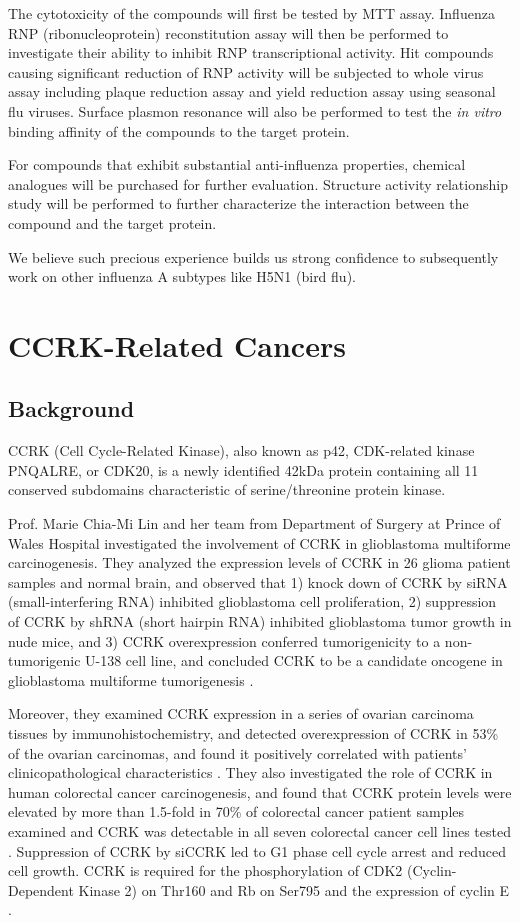 The cytotoxicity of the compounds will first be tested by MTT assay. Influenza RNP (ribonucleoprotein) reconstitution assay will then be performed to investigate their ability to inhibit RNP transcriptional activity. Hit compounds causing significant reduction of RNP activity will be subjected to whole virus assay including plaque reduction assay and yield reduction assay using seasonal flu viruses. Surface plasmon resonance will also be performed to test the \textit{in vitro} binding affinity of the compounds to the target protein. 

For compounds that exhibit substantial anti-influenza properties, chemical analogues will be purchased for further evaluation. Structure activity relationship study will be performed to further characterize the interaction between the compound and the target protein.

We believe such precious experience builds us strong confidence to subsequently work on other influenza A subtypes like H5N1 (bird flu).

\section{CCRK-Related Cancers}

\subsection{Background}

CCRK (Cell Cycle-Related Kinase), also known as p42, CDK-related kinase PNQALRE, or CDK20, is a newly identified 42kDa protein containing all 11 conserved subdomains characteristic of serine/threonine protein kinase.

Prof. Marie Chia-Mi Lin and her team from Department of Surgery at Prince of Wales Hospital investigated the involvement of CCRK in glioblastoma multiforme carcinogenesis. They analyzed the expression levels of CCRK in 26 glioma patient samples and normal brain, and observed that 1) knock down of CCRK by siRNA (small-interfering RNA) inhibited glioblastoma cell proliferation, 2) suppression of CCRK by shRNA (short hairpin RNA) inhibited glioblastoma tumor growth in nude mice, and 3) CCRK overexpression conferred tumorigenicity to a non-tumorigenic U-138 cell line, and concluded CCRK to be a candidate oncogene in glioblastoma multiforme tumorigenesis \citep{1144}.

Moreover, they examined CCRK expression in a series of ovarian carcinoma tissues by immunohistochemistry, and detected overexpression of CCRK in 53\% of the ovarian carcinomas, and found it positively correlated with patients' clinicopathological characteristics \citep{1145}. They also investigated the role of CCRK in human colorectal cancer carcinogenesis, and found that CCRK protein levels were elevated by more than 1.5-fold in 70\% of colorectal cancer patient samples examined and CCRK was detectable in all seven colorectal cancer cell lines tested \citep{1143}. Suppression of CCRK by siCCRK led to G1 phase cell cycle arrest and reduced cell growth. CCRK is required for the phosphorylation of CDK2 (Cyclin-Dependent Kinase 2) on Thr160 and Rb on Ser795 and the expression of cyclin E \citep{1143}. 

